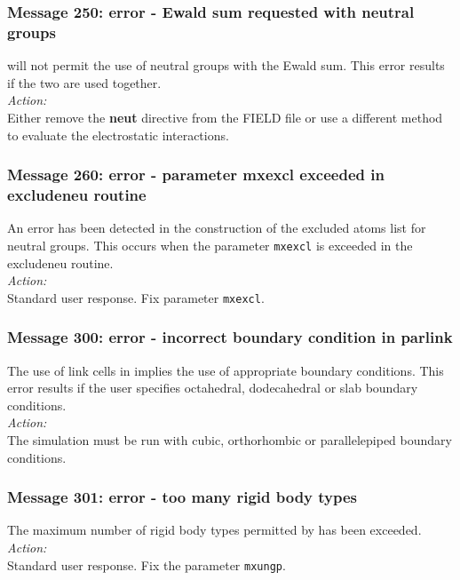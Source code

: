 \subsubsection*{Message 250: error - Ewald sum requested with neutral
groups}

\D{} will not permit the use of neutral groups with the Ewald
sum.  This
error results if the two are used together. \\

\noindent
{\em Action:} \\
Either remove the {\bf neut} directive from the FIELD file or use a different
method to evaluate the electrostatic interactions. 

\subsubsection*{Message 260: error - parameter mxexcl exceeded in 
excludeneu routine}

An error has been detected in the construction of the excluded atoms
list for neutral groups. This occurs when the parameter {\tt mxexcl} is
exceeded in the {\sc excludeneu} routine. \\

\noindent
{\em Action:}\\ Standard user response. Fix parameter {\tt mxexcl}.

\subsubsection*{Message 300: error - incorrect boundary condition in
parlink}

The use of link cells in \D{} implies the use of appropriate boundary
conditions. This error results if the user specifies octahedral,
dodecahedral or slab  boundary conditions. \\

\noindent
{\em Action:}\\
The simulation must be run with cubic, orthorhombic or parallelepiped
 boundary conditions.

\subsubsection*{Message 301: error - too many rigid body types}

The maximum number of rigid body  types permitted by \D{} has been
exceeded.\\

\noindent
{\em Action:}\\
Standard user response. Fix the parameter {\tt mxungp}.

